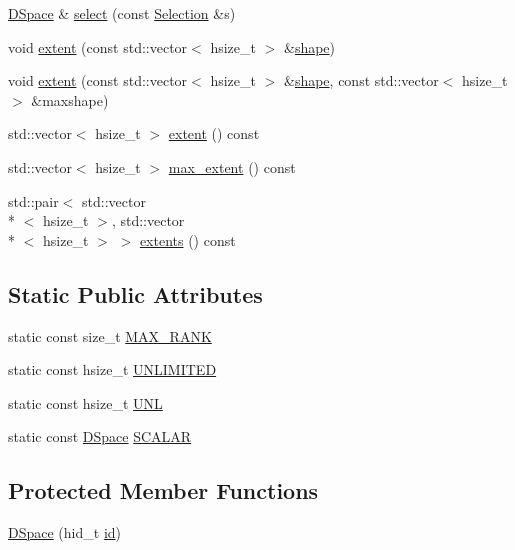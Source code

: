 \begin{DoxyCompactItemize}
\hyperlink{class_h5_t_l_1_1_d_space}{D\-Space} \& \hyperlink{class_h5_t_l_1_1_d_space_ab42688e0331b2b49d311d43dde36c31e}{select} (const \hyperlink{class_h5_t_l_1_1_selection}{Selection} \&s)
\item 
void \hyperlink{class_h5_t_l_1_1_d_space_a7557c53c7dc3b9b4e8a12cc35a438564}{extent} (const std\-::vector$<$ hsize\-\_\-t $>$ \&\hyperlink{namespace_h5_t_l_a18d3869e336e2b6a64ec318cf9890c90}{shape})
\item 
void \hyperlink{class_h5_t_l_1_1_d_space_a62a6b850d17c08da4437c6080f7c3598}{extent} (const std\-::vector$<$ hsize\-\_\-t $>$ \&\hyperlink{namespace_h5_t_l_a18d3869e336e2b6a64ec318cf9890c90}{shape}, const std\-::vector$<$ hsize\-\_\-t $>$ \&maxshape)
\item 
std\-::vector$<$ hsize\-\_\-t $>$ \hyperlink{class_h5_t_l_1_1_d_space_a217bb888d3d9666e1105a7b839f130d7}{extent} () const 
\item 
std\-::vector$<$ hsize\-\_\-t $>$ \hyperlink{class_h5_t_l_1_1_d_space_aa253d3194c386398cd3a614022226091}{max\-\_\-extent} () const 
\item 
std\-::pair$<$ std\-::vector\\*
$<$ hsize\-\_\-t $>$, std\-::vector\\*
$<$ hsize\-\_\-t $>$ $>$ \hyperlink{class_h5_t_l_1_1_d_space_a8d0637d8c3adbee551721f7fbd609de1}{extents} () const 
\end{DoxyCompactItemize}
\subsection*{Static Public Attributes}
\begin{DoxyCompactItemize}
\item 
static const size\-\_\-t \hyperlink{class_h5_t_l_1_1_d_space_aaff3fd7254edf581676b4d0a5740b80e}{M\-A\-X\-\_\-\-R\-A\-N\-K}
\item 
static const hsize\-\_\-t \hyperlink{class_h5_t_l_1_1_d_space_a2c7e4e6d7392338ff352da82243f9f21}{U\-N\-L\-I\-M\-I\-T\-E\-D}
\item 
static const hsize\-\_\-t \hyperlink{class_h5_t_l_1_1_d_space_a3f52ebf53e3a4da32927b0867a0bd8f9}{U\-N\-L}
\item 
static const \hyperlink{class_h5_t_l_1_1_d_space}{D\-Space} \hyperlink{class_h5_t_l_1_1_d_space_a0fd9cf77c7cd46e51764f71ce1e6eb11}{S\-C\-A\-L\-A\-R}
\end{DoxyCompactItemize}
\subsection*{Protected Member Functions}
\begin{DoxyCompactItemize}
\item 
\hyperlink{class_h5_t_l_1_1_d_space_add7bd418265b7dcea2e6b0fd60ea15e0}{D\-Space} (hid\-\_\-t \hyperlink{class_h5_t_l_1_1_i_d_ade483b65e8a77310b025e86b11cbc38c}{id})
\end{DoxyCompactItemize}
